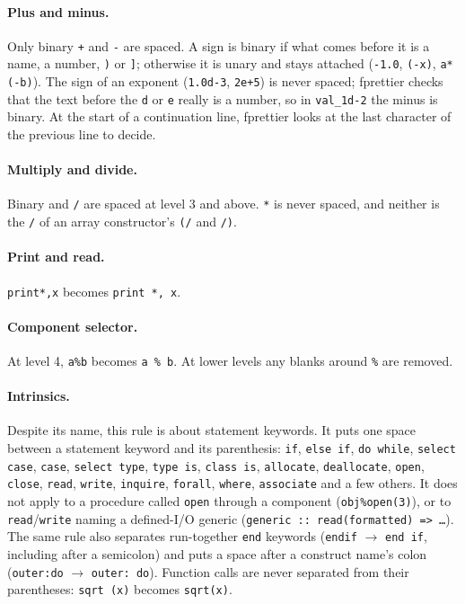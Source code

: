 \documentclass[11pt,a4paper,openany]{book}
\newcommand{\code}[1]{\texttt{\small #1}}
\begin{document}
\paragraph{Plus and minus.} Only binary \code{+} and \code{-} are spaced. A
sign is binary if what comes before it is a name, a number, \code{)} or
\code{]}; otherwise it is unary and stays attached (\code{-1.0},
\code{(-x)}, \code{a*(-b)}). The sign of an exponent (\code{1.0d-3},
\code{2e+5}) is never spaced; fprettier checks that the text before the
\code{d} or \code{e} really is a number, so in \code{val\_1d-2} the minus is
binary. At the start of a continuation line, fprettier looks at the last
character of the previous line to decide.

\paragraph{Multiply and divide.} Binary \code{*} and \code{/} are spaced at
level 3 and above. \code{**} is never spaced, and neither is the \code{/} of
an array constructor's \code{(/} and \code{/)}.

\paragraph{Print and read.} \code{print*,x} becomes \code{print *, x}.

\paragraph{Component selector.} At level 4, \code{a\%b} becomes \code{a \% b}.
At lower levels any blanks around \code{\%} are removed.

\paragraph{Intrinsics.} Despite its name, this rule is about statement
keywords. It puts one space between a statement keyword and its parenthesis:
\code{if}, \code{else if}, \code{do while}, \code{select case}, \code{case},
\code{select type}, \code{type is}, \code{class is}, \code{allocate},
\code{deallocate}, \code{open}, \code{close}, \code{read}, \code{write},
\code{inquire}, \code{forall}, \code{where}, \code{associate} and a few others.
It does not apply to a procedure called \code{open} through a component
(\code{obj\%open(3)}), or to \code{read}/\code{write} naming a defined-I/O generic
(\code{generic :: read(formatted) => \ldots}). The same rule also separates run-together
\code{end} keywords (\code{endif} $\to$ \code{end if}, including after a
semicolon) and puts a space after a construct name's colon (\code{outer:do}
$\to$ \code{outer: do}). Function calls are never separated from their
parentheses: \code{sqrt (x)} becomes \code{sqrt(x)}.
\end{document}
